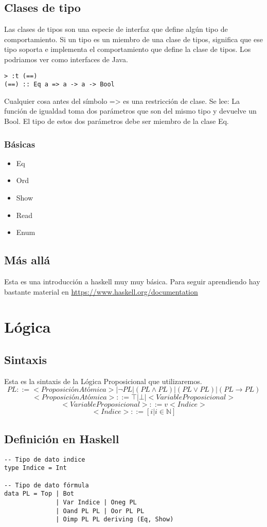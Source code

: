 \documentclass[11pt]{article}
\begin{document}
\subsection{Clases de tipo}
\label{sec:orgf1fb5f8}
Las clases de tipos son una especie de interfaz que define algún tipo de
comportamiento. Si un tipo es un miembro de una clase de tipos, significa 
que ese tipo soporta e implementa el comportamiento que define la clase de tipos.
Los podriamos ver como interfaces de Java.
\begin{verbatim}
> :t (==)
(==) :: Eq a => a -> a -> Bool
\end{verbatim}
Cualquier cosa antes del símbolo => es una restricción de clase.
Se lee: La función de igualdad toma dos parámetros que son del mismo tipo
y devuelve un Bool. El tipo de estos dos parámetros debe ser miembro de la
clase Eq.
\subsubsection{Básicas}
\label{sec:org5833fd8}
\begin{itemize}
\item Eq
\item Ord
\item Show
\item Read
\item Enum
\end{itemize}
\subsection{Más allá}
\label{sec:org00f6bf7}
Esta es una introducción a haskell muy muy básica.
Para seguir aprendiendo hay bastante material 
en \url{https://www.haskell.org/documentation}

\section{Lógica}
\label{sec:orgd37d7bd}
\subsection{Sintaxis}
\label{sec:org317a30e}
Esta es la sintaxis de la Lógica Proposicional que utilizaremos. 
\[PL ::= <ProposiciónAtómica> | \neg PL | (PL \land PL) | (PL \lor PL) | (PL \to PL) \]
\[<ProposiciónAtómica> ::= \top | \bot | <VariableProposicional>\]
\[<VariableProposicional> ::= v<Indice>\]
\[ <Indice> ::= [i | i \in \mathbb{N}]\]

\subsection{Definición en Haskell}
\label{sec:org3c70cbb}
\begin{verbatim}
-- Tipo de dato indice
type Indice = Int

-- Tipo de dato fórmula
data PL = Top | Bot 
              | Var Indice | Oneg PL 
              | Oand PL PL | Oor PL PL 
              | Oimp PL PL deriving (Eq, Show)
\end{verbatim}
\end{document}
